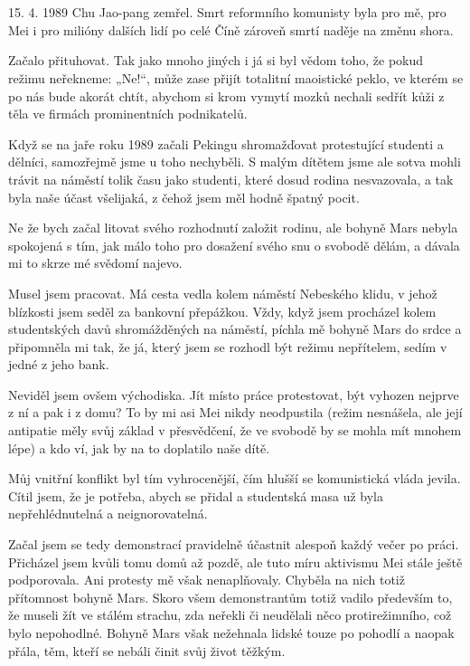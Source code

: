 \chapter{}
15. 4. 1989 Chu Jao-pang zemřel.  Smrt reformního komunisty byla pro mě, pro Mei i pro milióny dalších lidí po celé Číně zároveň smrtí naděje na změnu shora.

Začalo přituhovat. Tak jako mnoho jiných i já si byl vědom toho, že pokud režimu neřekneme: „Ne!“, může zase přijít totalitní maoistické peklo, ve kterém se po nás bude akorát chtít, abychom si krom vymytí mozků nechali sedřít kůži z těla ve firmách prominentních podnikatelů.

Když se na jaře roku 1989 začali Pekingu shromažďovat protestující studenti a dělníci, samozřejmě jsme u toho nechyběli. S malým dítětem jsme ale sotva mohli trávit na náměstí tolik času jako studenti, které dosud rodina nesvazovala, a tak byla naše účast všelijaká, z čehož jsem měl hodně špatný pocit.

Ne že bych začal litovat svého rozhodnutí založit rodinu, ale bohyně Mars nebyla spokojená s tím, jak málo toho pro dosažení svého snu o svobodě dělám, a dávala mi to skrze mé svědomí najevo.

Musel jsem pracovat. Má cesta vedla kolem náměstí Nebeského klidu, v jehož blízkosti jsem seděl za bankovní přepážkou. Vždy, když jsem procházel kolem studentských davů shromážděných na náměstí, píchla mě bohyně Mars do srdce a připomněla mi tak, že já, který jsem se rozhodl být režimu nepřítelem, sedím v jedné z jeho bank.

Neviděl jsem ovšem východiska. Jít místo práce protestovat, být vyhozen nejprve z ní a pak i z domu? To by mi asi Mei nikdy neodpustila (režim nesnášela, ale její antipatie měly svůj základ v přesvědčení, že ve svobodě by se mohla mít mnohem lépe) a kdo ví, jak by na to doplatilo naše dítě.

Můj vnitřní konflikt byl tím vyhrocenější, čím hlušší se komunistická vláda jevila. Cítil jsem, že je potřeba, abych se přidal a studentská masa už byla nepřehlédnutelná a neignorovatelná. 

Začal jsem se tedy demonstrací pravidelně účastnit alespoň každý večer po práci. Přicházel jsem kvůli tomu domů až pozdě, ale tuto míru aktivismu Mei stále ještě podporovala. Ani protesty mě však nenaplňovaly. Chyběla na nich totiž přítomnost bohyně Mars. Skoro všem demonstrantům totiž vadilo především to, že museli žít ve stálém strachu, zda neřekli či neudělali něco protirežimního, což bylo nepohodlné. Bohyně Mars však nežehnala lidské touze po pohodlí a naopak přála, těm, kteří se nebáli činit svůj život těžkým.

